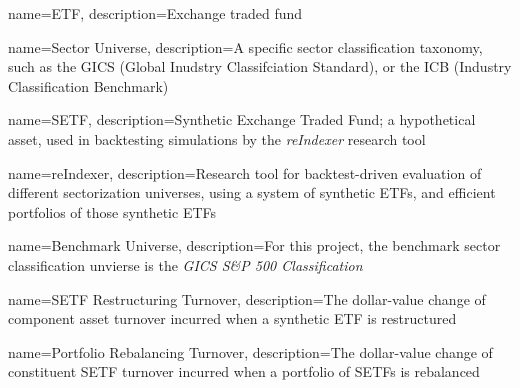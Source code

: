 \makeglossaries



{
    name=ETF,
    description={Exchange traded fund}
}


{
    name=Sector Universe,
    description={A specific sector classification taxonomy, such as the GICS (Global Inudstry Classifciation Standard), or the ICB (Industry Classification Benchmark)}
}

{
    name=SETF,
    description={Synthetic Exchange Traded Fund; a hypothetical asset, used in backtesting simulations by the \textit{reIndexer} research tool}
}

{
    name=reIndexer,
    description={Research tool for backtest-driven evaluation of different sectorization universes, using a system of synthetic ETFs, and efficient portfolios of those synthetic ETFs}
}

{
    name=Benchmark Universe,
    description={For this project, the benchmark sector classification unvierse is the \textit{GICS S\&P 500 Classification}}
}

{
    name=SETF Restructuring Turnover,
    description={The dollar-value change of component asset turnover incurred when a synthetic ETF is restructured}
}

{
    name=Portfolio Rebalancing Turnover,
    description={The dollar-value change of constituent SETF turnover incurred when a portfolio of SETFs is rebalanced}
}